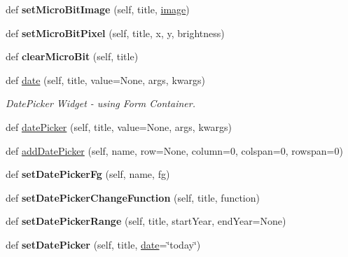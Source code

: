 \begin{DoxyCompactItemize}
def {\bfseries set\+Micro\+Bit\+Image} (self, title, \hyperlink{classappjar_1_1gui_a7bf059e8a509826c130aacb56902d593}{image})
\item 
\mbox{\label{classappjar_1_1gui_a4d4dd2d88bcecf8f8a4ae44c9e23bf76}} 
def {\bfseries set\+Micro\+Bit\+Pixel} (self, title, x, y, brightness)
\item 
\mbox{\label{classappjar_1_1gui_a80a4de5e0c3d8e0f6778f9eb86f71b0a}} 
def {\bfseries clear\+Micro\+Bit} (self, title)
\item 
def \hyperlink{classappjar_1_1gui_a490a20ea79169c697cdc7af5eb0a6199}{date} (self, title, value=None, args, kwargs)
\begin{DoxyCompactList}\small\item\em Date\+Picker Widget -\/ using Form Container. \end{DoxyCompactList}\item 
def \hyperlink{classappjar_1_1gui_a5a5939efc644b1946f3c28dcf35f2844}{date\+Picker} (self, title, value=None, args, kwargs)
\item 
def \hyperlink{classappjar_1_1gui_afd39e0992793b234290b349d7b2240d6}{add\+Date\+Picker} (self, name, row=None, column=0, colspan=0, rowspan=0)
\item 
\mbox{\label{classappjar_1_1gui_a6ac7242cd90307e0421381f1730f5c28}} 
def {\bfseries set\+Date\+Picker\+Fg} (self, name, fg)
\item 
\mbox{\label{classappjar_1_1gui_a0c2aff3d4930411a22e3782898e12009}} 
def {\bfseries set\+Date\+Picker\+Change\+Function} (self, title, function)
\item 
\mbox{\label{classappjar_1_1gui_a58290e033252a2ba3a91c7544d621c9f}} 
def {\bfseries set\+Date\+Picker\+Range} (self, title, start\+Year, end\+Year=None)
\item 
\mbox{\label{classappjar_1_1gui_ac3b040e397e1603b32230bec89f5aeca}} 
def {\bfseries set\+Date\+Picker} (self, title, \hyperlink{classappjar_1_1gui_a490a20ea79169c697cdc7af5eb0a6199}{date}=\char`\"{}today\char`\"{})
\item 
\mbox{\label{classappjar_1_1gui_a04ed9d067dd84fd52fd5ee84f73233ff}} 

\end{DoxyCompactItemize}
